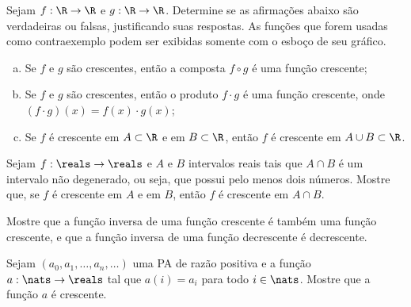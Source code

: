 \begin{exercise}
Sejam $f: \R \to \R $ e $g: \R \to \R$. Determine se as
afirmações abaixo são verdadeiras ou falsas, justificando suas
respostas. As funções que forem usadas como contraexemplo podem ser
exibidas somente com o esboço de seu gráfico.
\begin{enumerate}[(a)]
  \item Se $f$ e $g$ são crescentes, então a composta $f \circ g$ é uma função crescente;
  \item Se $f$ e $g$ são crescentes, então o produto $f\cdot g$ é
  uma função crescente, onde $(f \cdot g)(x) = f(x) \cdot g(x)$;
  \item Se $f$ é crescente em $A \subset \R$ e em $B \subset \R$, então $f$ é crescente em $A \cup B \subset \R$.
\end{enumerate}
\end{exercise}

\begin{exercise}
  Sejam $f : \reals \to \reals$ e $A$ e $B$ intervalos reais tais que $A \cap B$ é um intervalo não
  degenerado, ou seja, que possui pelo menos dois números. Mostre que, se $f$ é crescente
  em $A$ e em $B$, então $f$ é crescente em $A\cap B$.
\end{exercise}

\begin{exercise}
\label{exer:inversa-funcao-crescente}
Mostre que a função inversa de uma função crescente é também uma
função crescente, e que a função inversa de uma função decrescente é
decrescente.
\end{exercise}

\begin{exercise}
  Sejam $(a_0,a_1, \dots,a_n,\dots)$ uma PA de razão positiva e a função 
  $a : \nats \to \reals$ tal que $a(i)=a_i$ para todo $i\in\nats$.
  Mostre que a função $a$ é crescente.
\end{exercise}